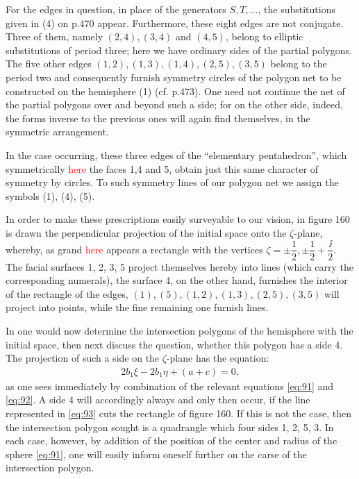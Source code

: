 For the edges in question, in place of the generators $S, T, \ldots$, the substitutions given in (4) on p.470 appear. Furthermore, these eight edges are not conjugate. Three of them, namely $(2,4), (3,4)$ and $(4,5)$, belong to elliptic substitutions of period three; here we have ordinary sides of the partial polygons. The five other edges $(1,2),(1,3),(1,4),(2,5),(3,5)$ belong to the period two and consequently furnish symmetry circles of the polygon net to be constructed on the hemisphere (1) (cf. p.473). One need not continue the net of the partial polygons over and beyond such a side; for on the other side, indeed, the forms inverse to the previous ones will again find themselves, in the symmetric arrangement.

In the case occurring, these three edges of the “elementary pentahedron”, which symmetrically \textcolor{red}{here} the faces 1,4 and 5, obtain just this same character of symmetry by circles. To such symmetry lines of our polygon net we assign the symbols (1), (4), (5).

In order to make these prescriptions easily surveyable to our vision, in figure 160 is drawn the perpendicular projection of the initial space onto the $\zeta$-plane, whereby, as grand \textcolor{red}{here} appears a rectangle with the vertices $\zeta=\pm\dfrac{1}{2},\pm\dfrac{1}{2}+\dfrac{\ii}{2}$. The facial surfaces 1, 2, 3, 5 project themselves hereby into lines (which carry the corresponding numerals), the surface 4, on the other hand, furnishes the interior of the rectangle of the edges, $(1), (5), (1,2), (1,3), (2,5), (3,5)$ will project into points, while the fine remaining one furnish lines.

In one would now determine the intersection polygons of the hemisphere with the initial space, then next discuss the question, whether this polygon has a side 4. The projection of such a side on the $\zeta$-plane has the equation:
\begin{align}\label{eq:93}
    2b_1\xi-2b_1\eta+(a+c)=0,
\end{align}
as one sees immediately by combination of the relevant equations \ref{eq:91} and \ref{eq:92}. A side 4 will accordingly always and only then occur, if the line represented in \ref{eq:93} cuts the rectangle of figure 160. If this is not the case, then the intersection polygon sought is a quadrangle which four sides 1, 2, 5, 3. In each case, however, by addition of the position of the center and radius of the sphere \ref{eq:91}, one will easily inform oneself further on the carse of the intersection polygon.

